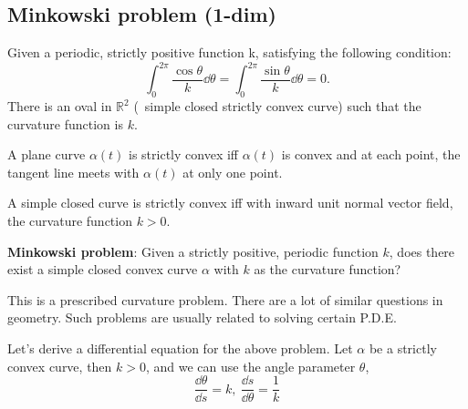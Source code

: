 \subsection{Minkowski problem (1-dim)}
\begin{theorem}\label{thm: Minkowski problem}
    Given a periodic, strictly positive function k, satisfying the following condition:
    \[\int_0^{2\pi}\frac{\cos \theta}{k}\dd \theta=
    \int_0^{2\pi}\frac{\sin \theta}{k}\dd \theta=0
    .\]
    There is an oval in 
    $\mathbb{R}^2$ (\ie\ simple closed strictly convex curve) such that 
    the curvature function is $k$. 
\end{theorem}
\begin{definition}
    A plane curve $\alpha(t)$ is strictly convex iff $\alpha(t)$ is convex 
    and at each point, the tangent line meets with $\alpha(t)$ at only 
    one point.
\end{definition}
\begin{proposition}
    A simple closed curve is strictly convex iff with inward unit normal 
    vector field, the curvature function $k>0$. 
\end{proposition}
\textbf{Minkowski problem}: Given a strictly positive, periodic function
$k$, does there exist a simple closed convex curve $\alpha$ with $k$
as the curvature function?
\begin{remark}
    This is a prescribed curvature problem. There are a lot of similar 
    questions in geometry. Such problems are usually related to solving
    certain P.D.E.
\end{remark}
Let's derive a differential equation for the above problem. Let $\alpha$ be 
a strictly convex curve, then $k>0$, and we can use the angle parameter $\theta$, \ie\ 
\[\frac{\dd\theta}{\dd s}=k,~\frac{\dd s}{\dd \theta}=\frac{1}{k} \]
\begin{center}
\end{center}
